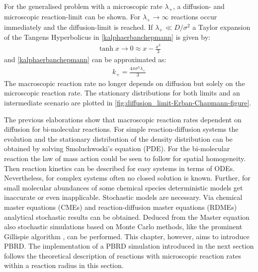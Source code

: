 \documentclass[
  a4paper,BCOR10mm,twoside,
  headsepline,footsepline,%
  fleqn,openbib
]{scrbook}
\begin{document}
\par
For the generalised problem with a microscopic rate $\lambda_{+}$, a diffusion- and microscopic reaction-limit can be shown. For $\lambda_{+} \rightarrow \infty $ reactions occur immediately and the diffusion-limit is reached. If  $\lambda_{+} \ll D/\sigma^2$ a Taylor expansion of the Tangens Hyperbolicus in \cref{kalphaerbanchepmann} is given by:
\begin{align}
\tanh{x\rightarrow 0} \approx x-\frac{x^3}{3}
\end{align}
and \cref{kalphaerbanchepmann} can be approximated as:
\begin{align}
 k_{+}=\frac{4 \pi \sigma^3 \lambda_{+}}{3}
\end{align}
The macroscopic reaction rate no longer depends on diffusion but solely on the microscopic reaction rate. The stationary distributions for both limits and an intermediate scenario are plotted in \cref{fig:diffusion_limit-Erban-Chapmann-figure}.\par
The previous elaborations show that macroscopic reaction rates dependent on diffusion for bi-molecular reactions. For simple reaction-diffusion systems the evolution and the stationary distribution of the density distribution can be obtained by solving Smoluchwoski's equation (PDE). For the bi-molecular reaction the law of mass action could be seen to follow for spatial homogeneity. Then reaction kinetics can be described for easy systems in terms of ODEs. Nevertheless, for complex systems often no closed solution is known. Further, for small molecular abundances of some chemical species deterministic models get inaccurate or even inapplicable. Stochastic models are necessary. Via chemical master equations (CMEs) and reaction-diffusion master equations (RDMEs) analytical stochastic results can be obtained. Deduced from the Master equation also stochastic simulations based on Monte Carlo methods, like the prominent Gillispie algorithm \cite{Gillespie1977}, can be performed. This chapter, however, aims to introduce PBRD. The implementation of a PBRD simulation introduced in the next section follows the theoretical description of reactions with microscopic reaction rates within a reaction radius in this section.
% 
% 
% 
% 
% 
% 
% 
% 
% 
% 
% 
% 
% 
% 
% 
\end{document}
